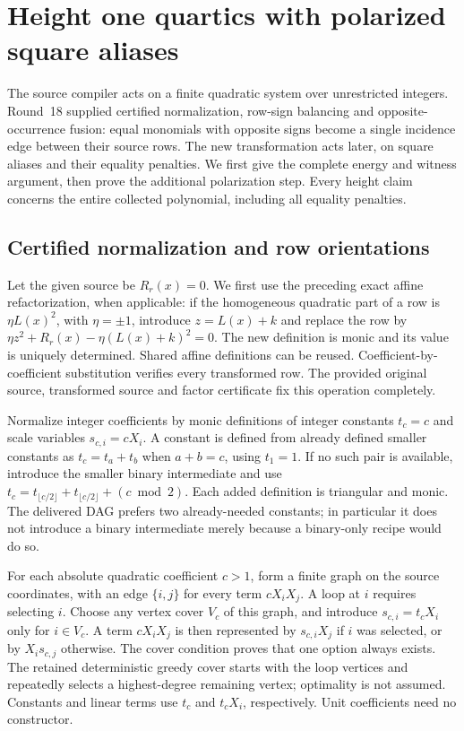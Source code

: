 \section{Height one quartics with polarized square aliases}
\label{sec:signed-network}
The source compiler acts on a finite quadratic system over unrestricted
integers. Round~18 supplied certified normalization, row-sign balancing and
opposite-occurrence fusion: equal monomials with opposite signs become a
single incidence edge between their source rows. The new transformation
acts later, on square aliases and their equality penalties. We first give
the complete energy and witness argument, then prove the additional
polarization step. Every height claim concerns the entire collected
polynomial, including all equality penalties.

\subsection{Certified normalization and row orientations}
Let the given source be $R_r(x)=0$. We first use the preceding exact affine
refactorization, when applicable: if the homogeneous quadratic part of a
row is $\eta L(x)^2$, with $\eta=\pm1$, introduce $z=L(x)+k$ and replace
the row by $\eta z^2+R_r(x)-\eta(L(x)+k)^2=0$. The new definition is monic
and its value is uniquely determined. Shared affine definitions can be
reused. Coefficient-by-coefficient substitution verifies every transformed
row. The provided original source, transformed source and factor
certificate fix this operation completely.

Normalize integer coefficients by monic definitions of integer constants
$t_c=c$ and scale variables $s_{c,i}=cX_i$. A constant is defined from
already defined smaller constants as $t_c=t_a+t_b$ when $a+b=c$, using
$t_1=1$. If no such pair is available, introduce the smaller binary
intermediate and use
$t_c=t_{\lfloor c/2\rfloor}+t_{\lfloor c/2\rfloor}+(c\bmod2)$.
Each added definition is triangular and monic. The delivered DAG prefers
two already-needed constants; in particular it does not introduce a
binary intermediate merely because a binary-only recipe would do so.

For each absolute quadratic coefficient $c>1$, form a finite graph on the
source coordinates, with an edge $\{i,j\}$ for every term $cX_iX_j$.
A loop at $i$ requires selecting $i$. Choose any vertex cover $V_c$ of
this graph, and introduce $s_{c,i}=t_cX_i$ only for $i\in V_c$. A term
$cX_iX_j$ is then represented by $s_{c,i}X_j$ if $i$ was selected, or by
$X_is_{c,j}$ otherwise. The cover condition proves that one option always
exists. The retained deterministic greedy cover starts with the loop
vertices and repeatedly selects a highest-degree remaining vertex;
optimality is not assumed. Constants and linear terms use $t_c$ and
$t_cX_i$, respectively. Unit coefficients need no constructor.

